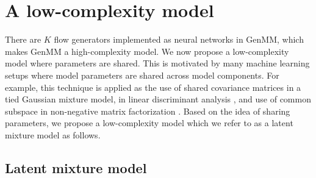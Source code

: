 \section{A low-complexity model}
There are $K$ flow generators implemented as neural networks in GenMM, which makes GenMM a high-complexity model.
We now propose a low-complexity model where parameters are shared. This is motivated by many machine learning setups where model parameters are shared across model components. For example, this technique is applied as the use of shared covariance matrices in a tied Gaussian mixture model, in linear discriminant analysis \cite{bellegarda1990tiedmixture, Kimball:1993:UTD:1075671.1075694, Bishop:2006:PRM:1162264}, and use of common subspace in non-negative matrix factorization \cite{Gupta2013}. Based on the idea of sharing parameters, we propose a low-complexity model which we refer to as a latent mixture model as follows.

\subsection{Latent mixture model}\label{subsec-latmm}

